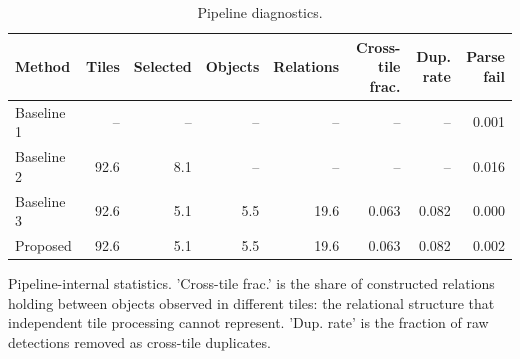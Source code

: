 \begin{table}[t]
\centering
\small
\begin{tabular}{lrrrrrrr}
\toprule
Method & Tiles & Selected & Objects & Relations & Cross-tile frac. & Dup. rate & Parse fail \\
\midrule
Baseline 1 & -- & -- & -- & -- & -- & -- & 0.001 \\
Baseline 2 & 92.6 & 8.1 & -- & -- & -- & -- & 0.016 \\
Baseline 3 & 92.6 & 5.1 & 5.5 & 19.6 & 0.063 & 0.082 & 0.000 \\
Proposed & 92.6 & 5.1 & 5.5 & 19.6 & 0.063 & 0.082 & 0.002 \\
\bottomrule
\end{tabular}
\vspace{2pt}
\begin{minipage}{\linewidth}\footnotesize Pipeline-internal statistics. 'Cross-tile frac.' is the share of constructed relations holding between objects observed in different tiles: the relational structure that independent tile processing cannot represent. 'Dup. rate' is the fraction of raw detections removed as cross-tile duplicates.\end{minipage}
\caption{Pipeline diagnostics.}
\label{tab:diagnostics}
\end{table}
